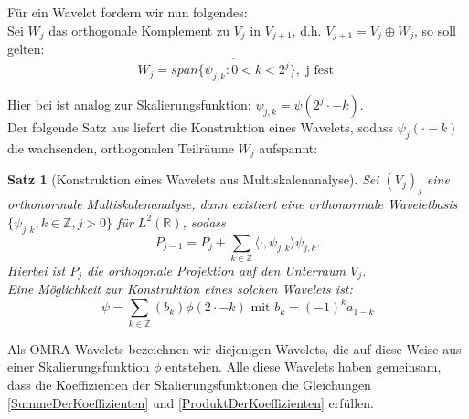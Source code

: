 \documentclass[11pt,a4paper,titlepage]{article}
\theoremstyle{plain} %
\newtheorem{satz}{Satz}[section] %
\newcommand{\skalar}[2]{\langle #1, #2\rangle}
\theoremstyle{definition} %
\numberwithin{equation}{section} %
\begin{document}
		Für ein Wavelet fordern wir nun folgendes:\\
		Sei $W_j$ das orthogonale Komplement zu $V_j$ in $V_{j+1}$, d.h. $V_{j+1}=V_j \oplus W_j$, so soll gelten: \\
		\begin{equation}
			W_j=\overline{span\{\psi_{j,k}:0<k<2^j\}}, \text{ j fest }
		\end{equation}
		
		Hier bei ist analog zur Skalierungsfunktion: $\psi_{j,k}= \psi(2^j \cdot - k)$.	\\
		Der folgende Satz aus \cite{Daubechies1992} liefert die Konstruktion eines Wavelets, sodass $\psi_{j}(\cdot-k)$ die wachsenden, orthogonalen Teilräume $W_j$ aufspannt: 
		\begin{satz}[Konstruktion eines Wavelets aus Multiskalenanalyse]
			Sei $(V_j)_j$ eine orthonormale Multiskalenanalyse, dann existiert eine orthonormale Waveletbasis $\{\psi_{j,k},k\in \mathbb{Z}, j >0\}$ für $L^2(\mathbb{R})$, sodass 
			\begin{equation}
				P_{j-1}=P_j+\sum_{k\in \mathbb{Z}}\skalar{\cdot}{\psi_{j,k}}\psi_{j,k}.
			\end{equation}
			Hierbei ist $P_j$ die orthogonale Projektion auf den Unterraum $V_j$.\\
			Eine Möglichkeit zur Konstruktion eines solchen Wavelets ist:
			\begin{equation}
				\psi = \sum_{k\in \mathbb{Z}}(b_k) \phi(2\cdot-k) \text{ mit } b_k=(-1)^k a_{1-k}
			\end{equation}
		\end{satz}
		
		

		Als OMRA-Wavelets bezeichnen wir diejenigen Wavelets, die auf diese Weise aus einer Skalierungsfunktion $\phi$ entstehen. Alle diese Wavelets haben gemeinsam, dass die Koeffizienten der Skalierungsfunktionen die Gleichungen \ref{SummeDerKoeffizienten} und \ref{ProduktDerKoeffizienten} erfüllen. 
		
\end{document}

